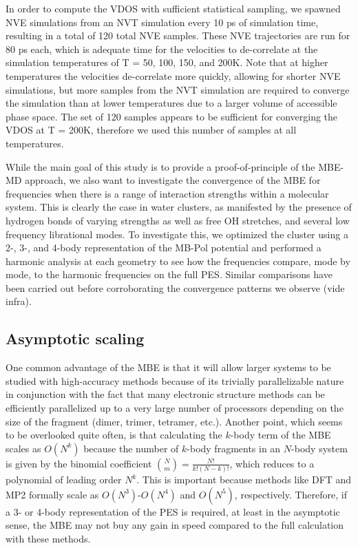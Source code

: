 \documentclass[11pt, proquest]{uwthesis}[2020/02/24]
\let\ce\ch
\begin{document}
\par In order to compute the VDOS with sufficient statistical sampling, we spawned NVE simulations from an NVT simulation every 10 ps of simulation time, resulting in a total of 120 total NVE samples. These NVE trajectories are run for 80 ps each, which is adequate time for the velocities to de-correlate at the simulation temperatures of T = 50, 100, 150, and 200K. Note that at higher temperatures the velocities de-correlate more quickly, allowing for shorter NVE simulations, but more samples from the NVT simulation are required to converge the simulation than at lower temperatures due to a larger volume of accessible phase space. The set of 120 samples appears to be sufficient for converging the VDOS at T = 200K, therefore we used this number of samples at all temperatures.

\par While the main goal of this study is to provide a proof-of-principle of the MBE-MD approach, we also want to investigate the convergence of the MBE for frequencies when there is a range of interaction strengths within a molecular system. This is clearly the case in water clusters, as manifested by the presence of hydrogen bonds of varying strengths as well as free OH stretches, and several low frequency librational modes. To investigate this, we optimized the \ce{(H2O)_{10}} cluster using a 2-, 3-, and 4-body representation of the MB-Pol potential and performed a harmonic analysis at each geometry to see how the frequencies compare, mode by mode, to the harmonic frequencies on the full PES. Similar comparisons have been carried out before\autocite{howard_n-body_2013,he_second-order_2012,sahu_low_2014} corroborating the convergence patterns we observe (vide infra).

\subsection{Asymptotic scaling}

\par One common advantage of the MBE is that it will allow larger systems to be studied with high-accuracy methods because of its trivially parallelizable nature in conjunction with the fact that many electronic structure methods can be efficiently parallelized up to a very large number of processors depending on the size of the fragment (dimer, trimer, tetramer, etc.). Another point, which seems to be overlooked quite often, is that calculating the $k$-body term of the MBE scales as $O(N^k)$ because the number of $k$-body fragments in an $N$-body system is given by the binomial coefficient $\binom{N}{m}=\frac{N!}{k!(N-k)!}$, which reduces to a polynomial of leading order $N^k$. This is important because methods like DFT and MP2 formally scale as $O(N^3)$-$O(N^4)$ and $O(N^5)$, respectively. Therefore, if a 3- or 4-body representation of the PES is required, at least in the asymptotic sense, the MBE may not buy any gain in speed compared to the full calculation with these methods.
\end{document}
